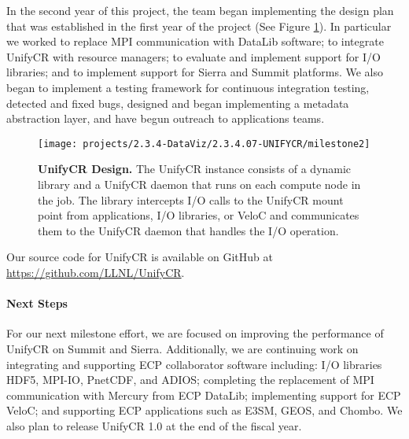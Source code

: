 In the second year of this project, the team began
implementing the design plan that was established in the first
year of the project (See Figure \ref{fig:milestone2}). In particular
we worked to replace MPI communication with DataLib software; to integrate
UnifyCR with resource managers; to evaluate and implement support for I/O 
libraries; and to implement support for Sierra and Summit platforms.
We also began to implement a testing framework for continuous integration
testing, detected and fixed bugs, designed and began implementing a 
metadata abstraction layer, and have begun outreach to applications teams.
\begin{figure}[htb]
        \centering
        \texttt{[image: projects/2.3.4-DataViz/2.3.4.07-UNIFYCR/milestone2]}
        \caption{\label{fig:milestone2} \textbf{UnifyCR Design.} The UnifyCR
instance consists of a dynamic library and a UnifyCR daemon that runs
on each compute node in the job. The library intercepts I/O calls to
the UnifyCR mount point from applications, I/O libraries, or VeloC and communicates them to the UnifyCR daemon that handles the I/O operation.}
\end{figure}


Our source code for UnifyCR is available on 
GitHub at \url{https://github.com/LLNL/UnifyCR}. 
\paragraph{Next Steps}

For our next milestone effort, we are focused on improving the performance
of UnifyCR on Summit and Sierra. Additionally, we are continuing work on 
integrating and supporting ECP collaborator software including:
I/O libraries HDF5, MPI-IO, PnetCDF, and ADIOS; completing the replacement
of MPI communication with Mercury from ECP DataLib; implementing
support for ECP VeloC; and supporting ECP applications such as
E3SM, GEOS, and Chombo.
We also plan to release UnifyCR 1.0 at the end of the fiscal year.

